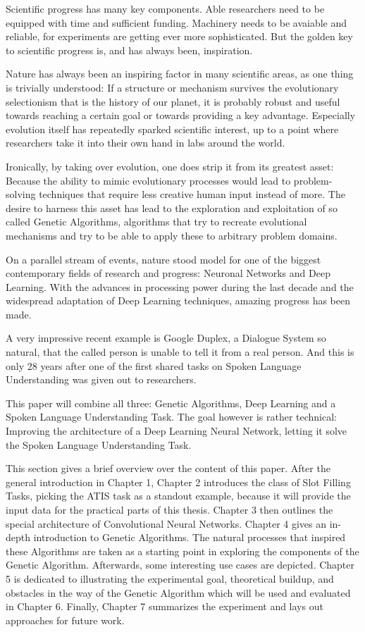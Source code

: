 \documentclass[11pt,a4paper,twoside,openright]{scrbook}
\begin{document}
Scientific progress has many key components. Able researchers need to be equipped with time and sufficient funding. Machinery needs to be avaiable and reliable, for experiments are getting ever more sophisticated. But the golden key to scientific progress is, and has always been, inspiration. %

Nature has always been an inspiring factor in many scientific areas, as one thing is trivially understood: If a structure or mechanism survives the evolutionary selectionism that is the history of our planet, it is probably robust and useful towards reaching a certain goal or towards providing a key advantage\cite{Bonabeau00,Pearce90,Lee05}.
Especially evolution itself has repeatedly sparked scientific interest, up to a point where researchers take it into their own hand in labs around the world.

Ironically, by taking over evolution, one does strip it from its greatest asset: Because the ability to mimic evolutionary processes would lead to problem-solving techniques that require less creative human input instead of more.
The desire to harness this asset has lead to the exploration and exploitation of so called Genetic Algorithms, algorithms that try to recreate evolutional mechanisms and try to be able to apply these to arbitrary problem domains.

On a parallel stream of events, nature stood model for one of the biggest contemporary fields of research and progress: Neuronal Networks and Deep Learning. With the advances in processing power during the last decade and the widespread adaptation of Deep Learning techniques, amazing progress has been made.

A very impressive recent example is Google Duplex, a Dialogue System so natural, that the called person is unable to tell it from a real person. And this is only 28 years after one of the first shared tasks on Spoken Language Understanding was given out to researchers.

This paper will combine all three: Genetic Algorithms, Deep Learning and a Spoken Language Understanding Task. The goal however is rather technical: Improving the architecture of a Deep Learning Neural Network, letting it solve the Spoken Language Understanding Task.


This section gives a brief overview over the content of this paper.
After the general introduction in Chapter 1, Chapter 2 introduces the class of Slot Filling Tasks, picking the ATIS task as a standout example, because it will provide the input data for the practical parts of this thesis.
Chapter 3 then outlines the special architecture of Convolutional Neural Networks.
Chapter 4 gives an in-depth introduction to Genetic Algorithms. The natural processes that inspired these Algorithms are taken as a starting point in exploring the components of the Genetic Algorithm. Afterwards, some interesting use cases are depicted.
Chapter 5 is dedicated to illustrating the experimental goal, theoretical buildup, and obstacles in the way of the Genetic Algorithm which will be used and evaluated in Chapter 6.
Finally, Chapter 7 summarizes the experiment and lays out approaches for future work.
\end{document}
